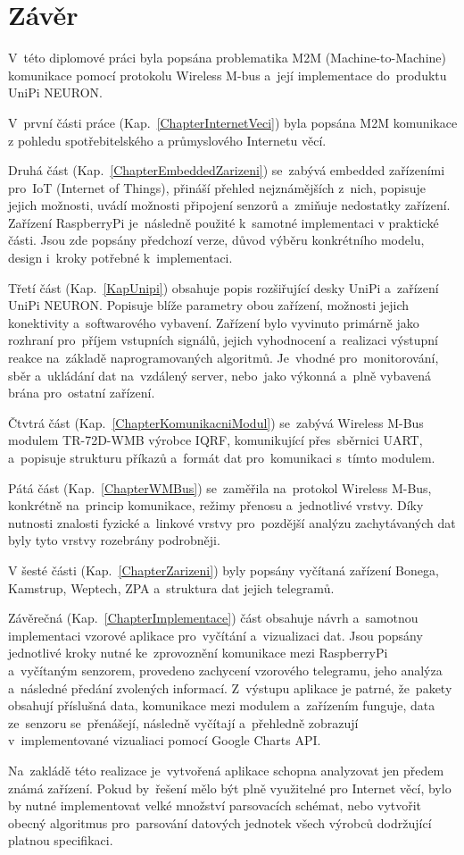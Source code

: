 \chapter{Závěr}

V~této diplomové práci byla popsána problematika M2M (Machine-to-Machine) komunikace pomocí protokolu Wireless M-bus a~její implementace do~produktu UniPi NEURON.


V~první části práce (Kap.~\ref{ChapterInternetVeci}) byla popsána M2M komunikace z pohledu spotřebitelského a průmyslového Internetu věcí.

Druhá část (Kap.~\ref{ChapterEmbeddedZarizeni}) se~zabývá embedded zařízeními pro~IoT (Internet of Things), přináší přehled nejznámějších z~nich, popisuje jejich možnosti, uvádí možnosti připojení senzorů a~zmiňuje nedostatky zařízení. Zařízení RaspberryPi je~následně použité k~samotné implementaci v praktické části. Jsou zde popsány předchozí verze, důvod výběru konkrétního modelu, design i~kroky potřebné k~implementaci.

Třetí část (Kap.~\ref{KapUnipi}) obsahuje popis rozšiřující desky UniPi a~zařízení UniPi NEURON. Popisuje blíže parametry obou zařízení, možnosti jejich konektivity a~softwarového vybavení. Zařízení bylo vyvinuto primárně jako rozhraní pro~příjem vstupních signálů, jejich vyhodnocení a~realizaci výstupní reakce na~základě naprogramovaných algoritmů. Je~vhodné pro~monitorování, sběr a~ukládání dat na~vzdálený server, nebo~jako výkonná a~plně vybavená brána pro~ostatní zařízení.

Čtvtrá část (Kap.~\ref{ChapterKomunikacniModul}) se~zabývá Wireless M-Bus modulem TR-72D-WMB výrobce IQRF, komunikující přes~sběrnici UART, a~popisuje strukturu příkazů a~formát dat pro~komunikaci s~tímto modulem.

Pátá část (Kap.~\ref{ChapterWMBus}) se~zaměřila na~protokol Wireless M-Bus, konkrétně na~princip komunikace, režimy přenosu a~jednotlivé vrstvy. 
Díky nutnosti znalosti fyzické a~linkové vrstvy pro~pozdější analýzu zachytávaných dat byly tyto vrstvy rozebrány podrobněji. 

V šesté části (Kap.~\ref{ChapterZarizeni}) byly popsány vyčítaná zařízení Bonega, Kamstrup, Weptech, ZPA a~struktura dat jejich telegramů.

Závěrečná (Kap.~\ref{ChapterImplementace}) část obsahuje návrh a~samotnou implementaci vzorové aplikace pro~vyčítání a~vizualizaci dat. Jsou popsány jednotlivé kroky nutné ke~zprovoznění komunikace mezi RaspberryPi a~vyčítaným senzorem, provedeno zachycení vzorového telegramu, jeho analýza a~následné předání zvolených informací. Z~výstupu aplikace je patrné, že~pakety obsahují příslušná data, komunikace mezi modulem a~zařízením funguje, data ze~senzoru se~přenášejí, následně vyčítají a~přehledně zobrazují v~implementované vizualiaci pomocí Google Charts API.

Na~zakládě této realizace je~vytvořená aplikace schopna analyzovat jen předem známá zařízení. Pokud by~řešení mělo být plně využitelné pro Internet věcí, bylo by nutné implementovat velké množství parsovacích schémat, nebo vytvořit obecný algoritmus pro~parsování datových jednotek všech výrobců dodržující platnou specifikaci.


